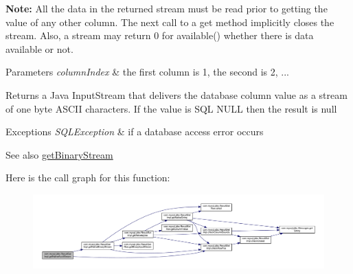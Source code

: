 {\bfseries Note\+:} All the data in the returned stream must be read prior to getting the value of any other column. The next call to a get method implicitly closes the stream. Also, a stream may return 0 for available() whether there is data available or not. 


\begin{DoxyParams}{Parameters}
{\em column\+Index} & the first column is 1, the second is 2, ...\\
\hline
\end{DoxyParams}
\begin{DoxyReturn}{Returns}
a Java Input\+Stream that delivers the database column value as a stream of one byte A\+S\+C\+II characters. If the value is S\+QL N\+U\+LL then the result is null
\end{DoxyReturn}

\begin{DoxyExceptions}{Exceptions}
{\em S\+Q\+L\+Exception} & if a database access error occurs\\
\hline
\end{DoxyExceptions}
\begin{DoxySeeAlso}{See also}
\mbox{\hyperlink{classcom_1_1mysql_1_1jdbc_1_1_result_set_impl_a59faa6b2172c9dafdc26ea397bc4fc93}{get\+Binary\+Stream}} 
\end{DoxySeeAlso}
Here is the call graph for this function\+:
\nopagebreak
\begin{figure}[H]
\begin{center}
\leavevmode
\includegraphics[width=350pt]{classcom_1_1mysql_1_1jdbc_1_1_result_set_impl_a25a66bda18485aa6fb3891ba594b8c57_cgraph}
\end{center}
\end{figure}
\mbox{\label{classcom_1_1mysql_1_1jdbc_1_1_result_set_impl_a98fc4a067a058aa2732badb05b9eb4f4}} 
